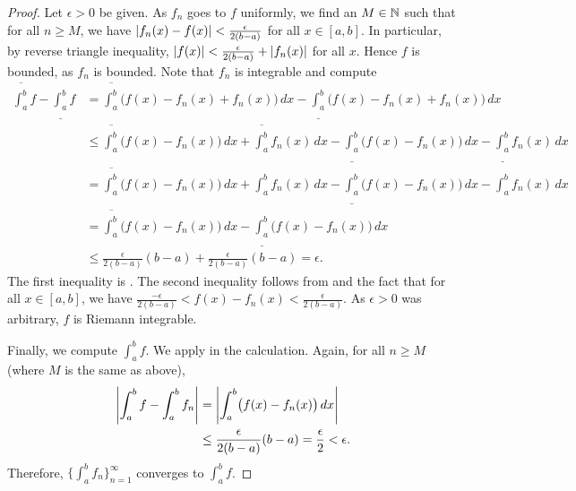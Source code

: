 \begin{proof}
Let $\epsilon > 0$ be given.
As $f_n$ goes to $f$ uniformly, we find an $M \in {\mathbb{N}}$ such that
for all $n \geq M$, we have 
$\left\lvert {f_n(x)-f(x)} \right\rvert < \frac{\epsilon}{2(b-a)}$ for all $x \in [a,b]$.
In particular, by reverse triangle inequality,
$\left\lvert {f(x)} \right\rvert < \frac{\epsilon}{2(b-a)} + \left\lvert {f_n(x)} \right\rvert$ for all $x$.
Hence $f$ is bounded,
as $f_n$ is bounded.
Note that $f_n$ is integrable and compute
\begin{equation*}
\begin{split}
\overline{\int_a^b} f
-
\underline{\int_a^b} f
& =
\overline{\int_a^b} \bigl( f(x) - f_n(x) + f_n(x) \bigr)\,dx
-
\underline{\int_a^b} \bigl( f(x) - f_n(x) + f_n(x) \bigr)\,dx
\\
& \leq
\overline{\int_a^b} \bigl( f(x) - f_n(x) \bigr)\,dx +  \overline{\int_a^b} f_n(x) \,dx
-
\underline{\int_a^b} \bigl( f(x) - f_n(x) \bigr)\,dx -  \underline{\int_a^b} f_n(x) \,dx
\\
& =
\overline{\int_a^b} \bigl( f(x) - f_n(x) \bigr)\,dx +  \int_a^b f_n(x) \,dx
-
\underline{\int_a^b} \bigl( f(x) - f_n(x) \bigr)\,dx -  \int_a^b f_n(x) \,dx
\\
& =
\overline{\int_a^b} \bigl( f(x) - f_n(x) \bigr)\,dx
-
\underline{\int_a^b} \bigl( f(x) - f_n(x) \bigr)\,dx
\\
& \leq
\frac{\epsilon}{2(b-a)} (b-a) + 
\frac{\epsilon}{2(b-a)} (b-a) = \epsilon .
\end{split}
\end{equation*}
The first inequality is .
The second inequality follows from  and 
the fact that for all $x \in [a,b]$, we have
$\frac{-\epsilon}{2(b-a)} < f(x)-f_n(x) < \frac{\epsilon}{2(b-a)}$.
As $\epsilon > 0$ was arbitrary, $f$ is Riemann integrable.

Finally, we compute $\int_a^b f$.  We apply 
in the calculation.  Again, for all $n \geq M$ (where $M$ is the same as above),
\begin{equation*}
\begin{split}
\left\lvert {\int_a^b f - \int_a^b f_n} \right\rvert & = 
\left\lvert { \int_a^b \bigl(f(x) - f_n(x)\bigr)\,dx} \right\rvert
\\
& \leq
\frac{\epsilon}{2(b-a)} (b-a) = \frac{\epsilon}{2} < \epsilon .
\end{split}
\end{equation*}
Therefore, $\bigl\{ \int_a^b f_n \bigr\}_{n=1}^\infty$ converges to $\int_a^b f$.
\end{proof}

